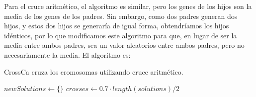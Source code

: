 \documentclass[11pt,a4paper]{article}
\begin{document}
Para el cruce aritmético, el algoritmo es similar, pero los genes de los hijos son la media de los genes de los padres. Sin embargo, como dos padres generan dos hijos, y estos dos hijos se generaría de igual forma, obtendríamos los hijos idénticos, por lo que modificamos este algoritmo para que, en lugar de ser la media entre ambos padres, sea un valor aleatorios entre ambos padres, pero no necesariamente la media. El algoritmo es: \\
\begin{algorithm}[H]
	\caption{{\sc CrossCa} cruza los cromosomas utilizando cruce aritmético.}
	
	$newSolutions \gets \{\}$ \;
	$crosses \gets 0.7 \cdot length(solutions) \slash 2$ \;
	
	
	 \;
\end{algorithm}
\end{document}
